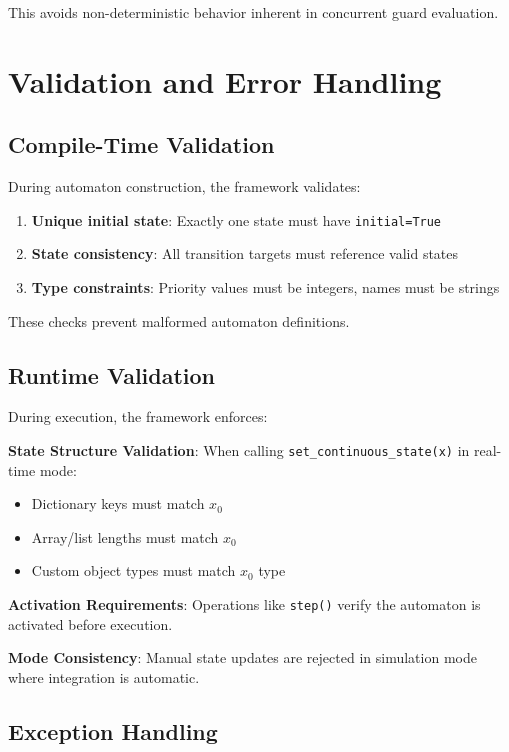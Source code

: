\documentclass[conference]{IEEEtran}
\begin{document}
This avoids non-deterministic behavior inherent in concurrent guard evaluation.

\section{Validation and Error Handling}

\subsection{Compile-Time Validation}

During automaton construction, the framework validates:

\begin{enumerate}
\item \textbf{Unique initial state}: Exactly one state must have \texttt{initial=True}
\item \textbf{State consistency}: All transition targets must reference valid states
\item \textbf{Type constraints}: Priority values must be integers, names must be strings
\end{enumerate}

These checks prevent malformed automaton definitions.

\subsection{Runtime Validation}

During execution, the framework enforces:

\textbf{State Structure Validation}: When calling \texttt{set\_continuous\_state(x)} in real-time mode:
\begin{itemize}
\item Dictionary keys must match $x_0$
\item Array/list lengths must match $x_0$
\item Custom object types must match $x_0$ type
\end{itemize}

\textbf{Activation Requirements}: Operations like \texttt{step()} verify the automaton is activated before execution.

\textbf{Mode Consistency}: Manual state updates are rejected in simulation mode where integration is automatic.

\subsection{Exception Handling}
\end{document}
